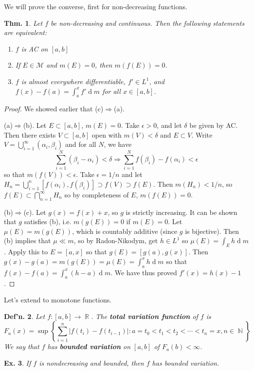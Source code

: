 \documentclass[12pt, a4paper]{book}
\DeclareMathOperator{\N}{\mathbb{N}}
\DeclareMathOperator{\R}{\mathbb{R}}
\renewcommand{\d}[1]{\ensuremath{\operatorname{d}\!{#1}}} %
\newtheorem{theorem}{Thm.}[section]
\newtheorem{definition}[theorem]{Def'n.}
\newtheorem{example}[theorem]{Ex.}
\theoremstyle{nonumberplain}
\newtheorem{proof}{Proof}
\begin{document}
We will prove the converse, first for non-decreasing functions.
\begin{theorem}
    Let $f$ be non-decreasing and continuous.
    Then the following statements are equivalent:
    \begin{enumerate}[nolistsep]
        \item $f$ is AC on $[a,b]$
        \item If $E\in\mathcal{M}$ and  $m(E)=0$, then $m(f(E))=0$.
        \item $f$ is almost everywhere differentiable, $f'\in L^1$, and $f(x)-f(a)=\int_a^x f'\d{m}$ for all $x\in[a,b]$.
    \end{enumerate}
\end{theorem}
\begin{proof}
    We showed earlier that (c)$\Rightarrow$(a).

    (a)$\Rightarrow$(b).
    Let $E\subset[a,b]$, $m(E)=0$.
    Take $\epsilon>0$, and let $\delta$ be given by AC.
    Then there exists $V\subset[a,b]$ open with $m(V)<\delta$ and $E\subset V$.
    Write $V=\bigcup_{i=1}^\infty(\alpha_i,\beta_i)$ and for all $N$, we have
    \[\sum\limits_{i=1}^N(\beta_i-\alpha_i)<\delta\Longrightarrow\sum\limits_{i=1}^N f(\beta_i)-f(\alpha_i)<\epsilon\]
    so that $m(f(V))<\epsilon$.
    Take $\epsilon=1/n$ and let $H_n=\bigcup_{i=1}^n[f(\alpha_i),f(\beta_i)]\supset f(V)\supset f(E)$.
    Then $m(H_n)<1/n$, so $f(E)\subset\bigcap_{n=1}^\infty H_n$ so by completeness of $E$, $m(f(E))=0$.

    (b)$\Rightarrow$(c).
    Let $g(x)=f(x)+x$, so $g$ is strictly increasing.
    It can be shown that $g$ satisfies (b), i.e. $m(g(E))=0$ if $m(E)=0$.
    Let $\mu(E)=m(g(E))$, which is countably additive (since $g$ is bijective).
    Then (b) implies that $\mu\ll m$, so by Radon-Nikodym, get $h\in L^1$ so $\mu(E)=\int_E h\d{m}$.
    Apply this to $E=[a,x]$ so that $g(E)=[g(a),g(x)]$.
    Then $g(x)-g(a)=m(g(E))=\mu(E)=\int_a^x h\d{m}$ so that $f(x)-f(a)=\int_a^x(h-a)\d{m}$.
    We have thus proved $f'(x)=h(x)-1$.
\end{proof}
Let's extend to monotone functions.
\begin{definition}
    Let $f:[a,b]\to\R$.
    The \textbf{total variation function} of $f$ is
    \[F_a(x)=\sup\left\{\sum\limits_{i=1}^n|f(t_i)-f(t_{i-1})|:a=t_0<t_1<t_2<\cdots<t_n=x,n\in\N\right\}\]
    We say that $f$ has \textbf{bounded variation} on $[a,b]$ of $F_a(b)<\infty$.
\end{definition}
\begin{example}
    If $f$ is nondecreasing and bounded, then $f$ has bounded variation.
\end{example}
\end{document}

